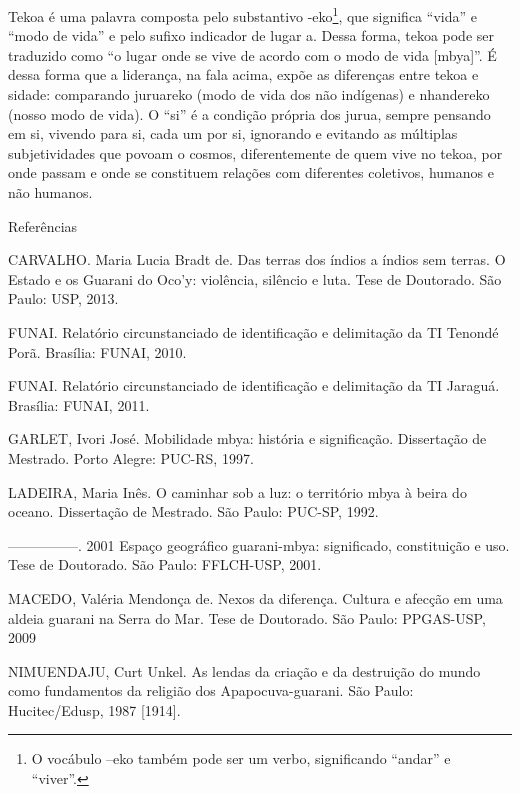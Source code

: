\documentclass{article}
\begin{document}
Tekoa \'e uma palavra composta pelo substantivo -eko\footnote{ O
voc\'abulo {}--eko tamb\'em pode ser um verbo, significando
{\textquotedblleft}andar{\textquotedblright} e
{\textquotedblleft}viver{\textquotedblright}. }, que significa
{\textquotedblleft}vida{\textquotedblright} e {\textquotedblleft}modo
de vida{\textquotedblright} e pelo sufixo indicador de lugar a. Dessa
forma, tekoa pode ser traduzido como {\textquotedblleft}o lugar onde se
vive de acordo com o modo de vida [mbya]{\textquotedblright}. \'E dessa
forma que a lideran\c{c}a, na fala acima, exp\~oe as diferen\c{c}as
entre tekoa e sidade: comparando juruareko (modo de vida dos n\~ao
ind\'igenas) e nhandereko (nosso modo de vida). O
{\textquotedblleft}si{\textquotedblright} \'e a condi\c{c}\~ao
pr\'opria dos jurua, sempre pensando em si, vivendo para si, cada um
por si, ignorando e evitando as m\'ultiplas subjetividades que povoam o
cosmos, diferentemente de quem vive no tekoa, por onde passam e onde se
constituem rela\c{c}\~oes com diferentes coletivos, humanos e n\~ao
humanos.

Refer\^encias 

CARVALHO. Maria Lucia Bradt de. Das terras dos \'indios a \'indios sem
terras. O Estado e os Guarani do Oco{\textquoteright}y: viol\^encia,
sil\^encio e luta. Tese de Doutorado. S\~ao Paulo: USP, 2013.

FUNAI. Relat\'orio circunstanciado de identifica\c{c}\~ao e
delimita\c{c}\~ao da TI Tenond\'e Por\~a. Bras\'ilia: FUNAI, 2010.

FUNAI. Relat\'orio circunstanciado de identifica\c{c}\~ao e
delimita\c{c}\~ao da TI Jaragu\'a. Bras\'ilia: FUNAI, 2011.

GARLET, Ivori Jos\'e. Mobilidade mbya: hist\'oria e significa\c{c}\~ao.
Disserta\c{c}\~ao de Mestrado. Porto Alegre: PUC-RS, 1997.

LADEIRA, Maria In\^es. O caminhar sob a luz: o territ\'orio mbya \`a
beira do oceano. Disserta\c{c}\~ao de Mestrado. S\~ao Paulo: PUC-SP,
1992. 

{}---{}---{}---{}---{}---. 2001 Espa\c{c}o geogr\'afico guarani-mbya:
significado, constitui\c{c}\~ao e uso. Tese de Doutorado. S\~ao Paulo:
FFLCH-USP, 2001.

MACEDO, Val\'eria Mendon\c{c}a de. Nexos da diferen\c{c}a. Cultura e
afec\c{c}\~ao em uma aldeia guarani na Serra do Mar. Tese de Doutorado.
S\~ao Paulo: PPGAS-USP, 2009

NIMUENDAJU, Curt Unkel. As lendas da cria\c{c}\~ao e da destrui\c{c}\~ao
do mundo como fundamentos da religi\~ao dos Apapocuva-guarani. S\~ao
Paulo: Hucitec/Edusp, 1987 [1914].
\end{document}

